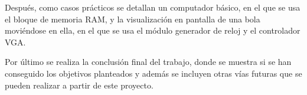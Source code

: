 Después, como casos prácticos se detallan un computador básico, en el que se usa el bloque de memoria RAM, y la visualización en pantalla de una bola moviéndose 
en ella, en el que se usa el módulo generador de reloj y el controlador VGA.

Por último se realiza la conclusión final del trabajo, donde se muestra si se han conseguido los objetivos planteados y además se incluyen otras vías futuras que se 
pueden realizar a partir de este proyecto.